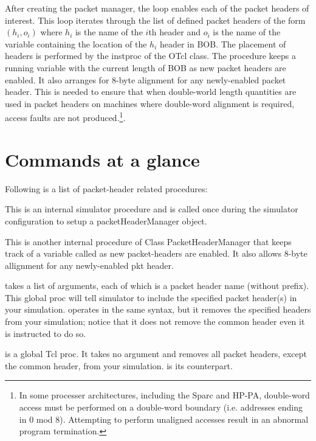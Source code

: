 \label{sec:configpacket}
After creating the packet manager, the 
loop enables each of the packet headers of interest.
This loop iterates through the list of defined
packet headers of the form
$(h_i, o_i)$ where $h_i$ is the name of the  $i$th header
and $o_i$ is the name of the variable containing the
location of the $h_i$ header in BOB.
The placement of headers is performed by the 
instproc of the  OTcl class.
The procedure keeps a running variable  with
the current length of BOB as new packet headers are enabled.
It also arranges for 8-byte alignment for any newly-enabled packet
header.
This is needed to ensure that when double-world length quantities
are used in packet headers on machines where double-word alignment
is required, access faults are not produced.\footnote{In
some processer architectures, including the
Sparc and HP-PA, double-word access must be performed on a double-word
boundary (i.e. addresses ending in 0 mod 8).  Attempting to perform
unaligned accesses result in an abnormal program termination.}.


\section{Commands at a glance}
\label{sec:pktcommand}

Following is a list of packet-header related procedures:
\begin{flushleft}

This is an internal simulator procedure and is called once during the simulator
configuration to setup a packetHeaderManager object.


This is another internal procedure of Class PacketHeaderManager that
keeps track 
of a variable called  as new packet-headers are
enabled. 
It also allows 8-byte allignment for any newly-enabled pkt header.

takes a list of arguments, each of which is a packet header name
(without  prefix). This global proc will tell
simulator to include the specified packet header(s) in your
simulation. 
 operates in the same syntax, but it
removes the specified headers from your simulation; notice that it
does not remove the common header even it is instructed to do so.

 is a global Tcl proc. It takes no
argument and removes all packet headers, except the common header,
from your simulation.  is its
counterpart. 

\end{flushleft}
\endinput
